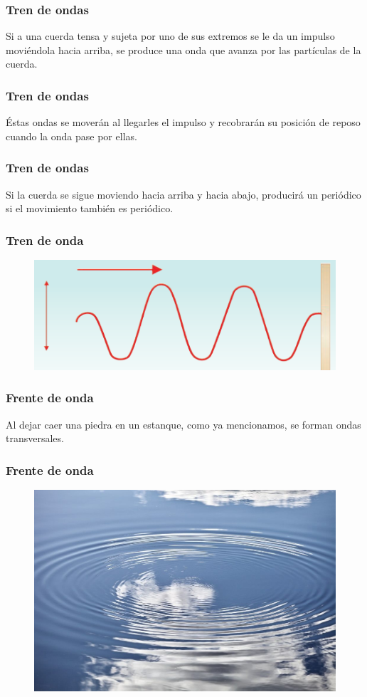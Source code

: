 \documentclass[14pt]{beamer}
\begin{document}
\begin{frame}
\frametitle{Tren de ondas}
Si a una cuerda tensa y sujeta por uno de sus extremos se le da un impulso moviéndola hacia arriba, se produce una onda que avanza por las partículas de la cuerda.
\end{frame}
\begin{frame}
\frametitle{Tren de ondas}
Éstas ondas se moverán al llegarles el impulso y recobrarán su posición de reposo cuando la onda pase por ellas.
\end{frame}
\begin{frame}
\frametitle{Tren de ondas}
Si la cuerda se sigue moviendo hacia arriba y hacia abajo, producirá un  periódico si el movimiento también es periódico.
\end{frame}
\begin{frame}
\frametitle{Tren de onda}
\begin{figure}
    \centering
    \includegraphics[scale=0.8]{Imagenes/Tren_Onda_01.png}
\end{figure}
\end{frame}
\begin{frame}
\frametitle{Frente de onda}
Al dejar caer una piedra en un estanque, como ya mencionamos, se forman ondas transversales.
\end{frame}
\begin{frame}
\frametitle{Frente de onda}
\begin{figure}
    \centering
    \includegraphics[scale=0.25]{Imagenes/Ondas_06.jpg}
\end{figure}
\end{frame}
\end{document}
